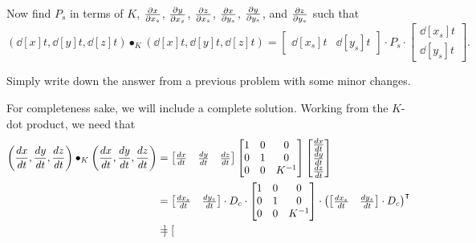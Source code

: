 \documentclass{ximera}
\begin{document}
\begin{problem}
  Now find $P_s$ in terms of $K$, $\pp[x]{x_s}$, $\pp[y]{x_s}$,
  $\pp[z]{x_s}$, $\pp[x]{y_s}$, $\pp[y]{y_s}$, and $\pp[z]{y_s}$ such
  that
  \[
  \left(\dd[x]{t}, \dd[y]{t}, \dd[z]{t}\right)\bullet_K
  \left(\dd[x]{t}, \dd[y]{t}, \dd[z]{t}\right)
  =
  \begin{bmatrix}
    \dd[x_s]{t} &  \dd[y_s]{t}
  \end{bmatrix}
  \cdot P_s
  \cdot
  \begin{bmatrix}
    \dd[x_s]{t} \\  \dd[y_s]{t}
  \end{bmatrix}.
  \]
  \begin{hint}
  Simply write down the answer from a previous problem with some minor
  changes.
  \end{hint}
  \begin{freeResponse}
    For completeness sake, we will include a complete solution.
    Working from the $K$-dot product, we need that
    \begin{align*}
    \left(\dd[x]{t}, \dd[y]{t}, \dd[z]{t}\right)\bullet_K
    \left(\dd[x]{t}, \dd[y]{t}, \dd[z]{t}\right)
    &=
    \begin{bmatrix}
      \dd[x]{t} & \dd[y]{t} & \dd[z]{t}
    \end{bmatrix}
    \begin{bmatrix}
      1 & 0 & 0\\
      0 & 1 & 0\\
      0 & 0 & K^{-1}
    \end{bmatrix}
    \begin{bmatrix}
      \dd[x]{t} \\ \dd[y]{t} \\ \dd[z]{t}
    \end{bmatrix}\\
    &=
    \begin{bmatrix}
      \frac{dx_s}{dt} & \frac{dy_s}{dt}
    \end{bmatrix}\cdot D_{c}\cdot
    \begin{bmatrix}
      1 & 0 & 0\\
      0 & 1 & 0\\
    0 & 0 & K^{-1}
    \end{bmatrix}
    \cdot
    \left(
    \begin{bmatrix}
      \frac{dx_s}{dt} & \frac{dy_s}{dt}
    \end{bmatrix}\cdot D_{c}
    \right)^\transpose\\
    &=
    \begin{bmatrix}

\end{bmatrix}
\end{align*}
\end{freeResponse}
\end{problem}
\end{document}
